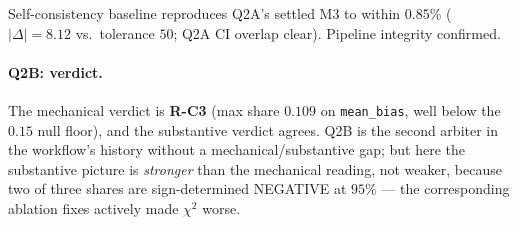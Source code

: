 \documentclass[11pt]{article}
\theoremstyle{definition}
\theoremstyle{plain}
\begin{document}
Self-consistency baseline reproduces Q2A's settled M3 to within
$0.85\%$ ($|\Delta| = 8.12$ vs.\ tolerance $50$; Q2A CI overlap
clear). Pipeline integrity confirmed.

\paragraph{Q2B: verdict.}
The mechanical verdict is \textbf{R-C3} (max share $0.109$ on
\texttt{mean\_bias}, well below the $0.15$ null floor), and the
substantive verdict agrees. Q2B is the second arbiter in the
workflow's history without a mechanical/substantive gap; but here
the substantive picture is \emph{stronger} than the mechanical
reading, not weaker, because two of three shares are
sign-determined NEGATIVE at $95\%$ --- the corresponding ablation
fixes actively made $\chi^{2}$ worse.
\end{document}
